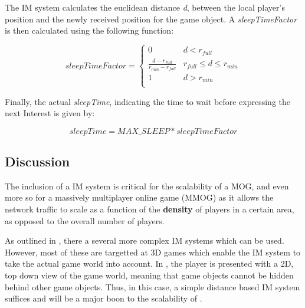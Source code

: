The IM system calculates the euclidean distance \textit{d}, between the local player's position and the newly received position for the game object. A \textit{sleepTimeFactor} is then calculated using the following function:


\begin{equation}
sleepTimeFactor =
\begin{cases} 
    0 & d < r_{full} \\
    \frac{d - r_{full}}{r_{min} - r_{full}} & r_{full} \leq d \leq r_{min} \\
    1 & d > r_{min} \\
\end{cases}
\end{equation}

Finally, the actual \textit{sleepTime}, indicating the time to wait before expressing the next Interest is given by:

\begin{equation}
    sleepTime = MAX\_SLEEP * sleepTimeFactor
\end{equation}

\subsection{Discussion}
The inclusion of a IM system is critical for the scalability of a MOG, and even more so for a massively multiplayer online game (MMOG) as it allows the network traffic to scale as a function of the \textbf{density} of players in a certain area, as opposed to the overall number of players.

As outlined in , there a several more complex IM systems which can be used. However, most of these are targetted at 3D games which enable the IM system to take the actual game world into account. In \game{}, the player is presented with a 2D, top down view of the game world, meaning that game objects cannot be hidden behind other game objects. Thus, in this case, a simple distance based IM system suffices and will be a major boon to the scalability of \game{}.
